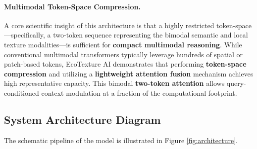 \documentclass[12pt, a4paper]{article}
\begin{document}
\paragraph{Multimodal Token-Space Compression.} A core scientific insight of this architecture is that a highly restricted token-space---specifically, a two-token sequence representing the bimodal semantic and local texture modalities---is sufficient for \textbf{compact multimodal reasoning}. While conventional multimodal transformers typically leverage hundreds of spatial or patch-based tokens, EcoTexture AI demonstrates that performing \textbf{token-space compression} and utilizing a \textbf{lightweight attention fusion} mechanism achieves high representative capacity. This bimodal \textbf{two-token attention} allows query-conditioned context modulation at a fraction of the computational footprint.

\subsection{System Architecture Diagram}
The schematic pipeline of the model is illustrated in Figure \ref{fig:architecture}.
\end{document}
